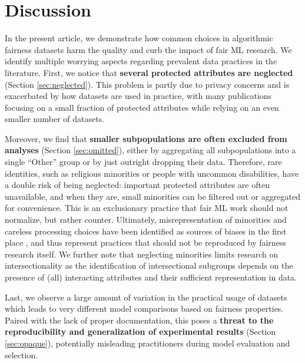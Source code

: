 \section{Discussion} \label{sec:discussion}

In the present article, we demonstrate how common choices in algorithmic fairness datasets harm the quality and curb the impact of fair ML research. We identify multiple worrying aspects regarding prevalent data practices in the literature. First, we notice that \textbf{several protected attributes are neglected} (Section \ref{sec:neglected}). This problem is partly due to privacy concerns and is exacerbated by how datasets are used in practice, with many publications focusing on a small fraction of protected attributes while relying on an even smaller number of datasets. 

Moreover, we find that \textbf{smaller subpopulations are often excluded from analyses} (Section \ref{sec:omitted}), either by aggregating all subpopulations into a single ``Other'' group or by just outright dropping their data. Therefore, rare identities, such as religious minorities or people with uncommon disabilities, have a double risk of being neglected: important protected attributes are often unavailable, and when they are, small minorities can be filtered out or aggregated for convenience. This is an exclusionary practice that fair ML work should not normalize, but rather counter. Ultimately, misrepresentation of minorities and careless processing choices have been identified as sources of biases in the first place \citep{rodolfa2020bias}, and thus represent practices that should not be reproduced by fairness research itself. We further note that neglecting minorities limits research on intersectionality as the identification of intersectional subgroups depends on the presence of (all) interacting attributes and their sufficient representation in data. 

Last, we observe a large amount of variation in the practical usage of datasets which leads to very different model comparisons based on fairness properties. Paired with the lack of proper documentation, this poses a \textbf{threat to the reproducibility and generalization of experimental results}  (Section \ref{sec:opaque}), potentially misleading practitioners during model evaluation and selection.

